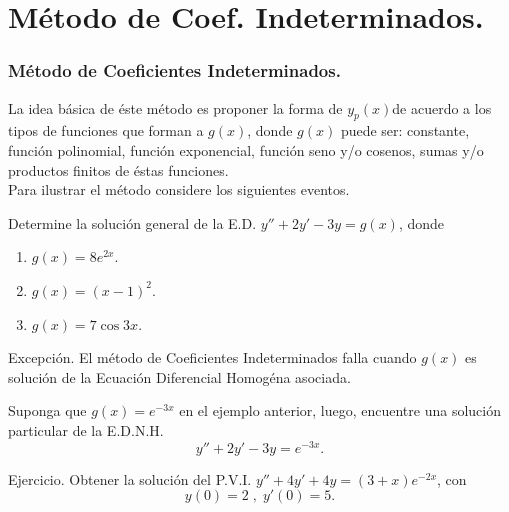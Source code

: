 \documentclass{beamer}
\begin{document}
\section{Método de Coef. Indeterminados.} %
\begin{frame}[t]
	\frametitle{Método de Coeficientes Indeterminados.}
	\begin{block}{}
		La idea básica de éste método es proponer la forma de \(y_p(x)\)de acuerdo a los tipos de funciones que forman a \(g(x)\), donde \(g(x)\) puede ser: constante, función polinomial, función exponencial, función seno y/o cosenos, sumas y/o productos finitos de éstas funciones. \\[2mm]
		Para ilustrar el método considere los siguientes eventos.
	\end{block}
	\begin{example}
		Determine la solución general de la E.D. \(y'' + 2y' -3y=g(x)\), donde
		\begin{enumerate}
			\item \(g(x) = 8e^{2x}\).
			\item \(g(x) = (x-1) ^2\).
			\item \(g(x) = 7 \cos 3x\).
		\end{enumerate}
	\end{example}
\end{frame}
\begin{frame}[t]
\end{frame}

\begin{frame}[t]
	\begin{block}{Excepción.}
		El método de Coeficientes Indeterminados falla cuando \(g(x)\) es solución de la Ecuación Diferencial Homogéna asociada.
	\end{block}
	\begin{example}
		Suponga que \(g(x) =e^{-3x}\) en el ejemplo anterior, luego, encuentre una solución particular de la E.D.N.H.
		\[
			y'' +2y' -3y=e^{-3x}.
		\]
	\end{example}
\end{frame}
\begin{frame}[t]
\end{frame}

\begin{frame}[t]
	\begin{alertblock}{Ejercicio.}
		Obtener la solución del P.V.I. \(y'' +4y' +4y=(3+x) e^{-2x}\), con
		\[
			y(0) = 2 \;,\; y' (0) =5.
		\]
	\end{alertblock}
\end{frame}
\end{document}
